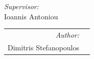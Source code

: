 \begin{titlepage}
\begin{center}
\end{center}

\noindent
\begin{minipage}[t]{.49\textwidth}
\raggedright
\large
\emph{Supervisor:}\\
Ioannis Antoniou
\end{minipage}%
%
\hfill
%
\begin{minipage}[t]{.49\textwidth}
\raggedleft
\begin{tabular}[t]{@{} r l @{}}
\large
\emph{Author:}\\
\large
Dimitris Stefanopoulos
\end{tabular}
\end{minipage}\\
\end{titlepage}
